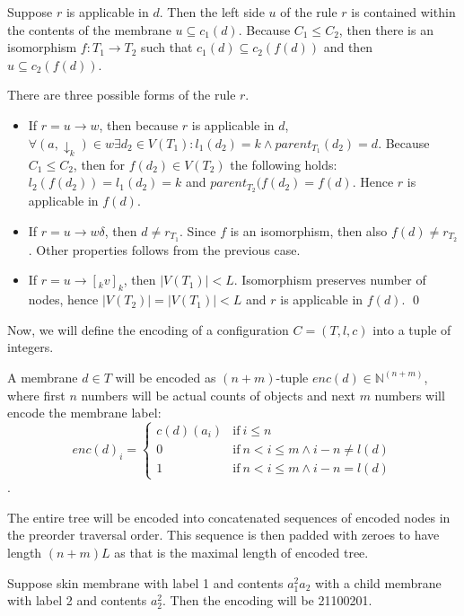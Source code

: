 \begin{dokaz}
  Suppose $r$ is applicable in $d$. Then the left side $u$ of the rule $r$ is contained within the contents of the membrane $u\subseteq c_1(d)$. Because $C_1\leq C_2$, then there is an isomorphism $f:T_1\rightarrow T_2$ such that $c_1(d)\subseteq c_2(f(d))$ and then $u\subseteq c_2(f(d))$.

  There are three possible forms of the rule $r$.
  \begin{itemize}
    \item If $r = u\rightarrow w$, then because $r$ is applicable in $d$, $\forall (a,\downarrow_k)\in w \exists d_2\in V(T_1): l_1(d_2)=k \wedge parent_{T_1}(d_2) = d$. Because $C_1\leq C_2$, then for $f(d_2)\in V(T_2)$ the following holds: $l_2(f(d_2)) = l_1(d_2) = k$ and $parent_{T_2}(f(d_2) = f(d)$. Hence $r$ is applicable in $f(d)$.
    \item If $r = u\rightarrow w\delta$, then $d\neq r_{T_1}$. Since $f$ is an isomorphism, then also $f(d)\neq r_{T_2}$. Other properties follows from the previous case.
    \item If $r = u\rightarrow [_k v]_k$, then $|V(T_1)|<L$. Isomorphism preserves number of nodes, hence $|V(T_2)| = |V(T_1)| < L$ and $r$ is applicable in $f(d)$. \qed
  \end{itemize}
\end{dokaz}

Now, we will define the encoding of a configuration $C = (T, l, c)$ into a tuple of integers.

A membrane $d\in T$ will be encoded as $(n+m)$-tuple $enc(d)\in\mathbb N^{(n+m)}$, where first $n$ numbers will be actual counts of objects and next $m$ numbers will encode the membrane label:
\[
  enc(d)_{i} =
  \begin{cases}
    c(d)(a_i) & \text{if}\ i\leq n\\
    0 & \text{if}\ n<i\leq m\wedge i-n\neq l(d)\\
    1 & \text{if}\ n<i\leq m\wedge i-n=l(d)
  \end{cases}
\].

The entire tree will be encoded into concatenated sequences of encoded nodes in the preorder traversal order. This sequence is then padded with zeroes to have length $(n+m)L$ as that is the maximal length of encoded tree.

\begin{example}
  Suppose skin membrane with label 1 and contents $a_1^2a_2$ with a child membrane with label 2 and contents $a_2^2$. Then the encoding will be 21100201.
\end{example} 

